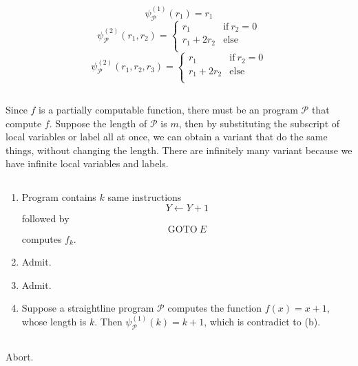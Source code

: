 \subsection{}
\[ \psi_{\mathscr{P}}^{(1)}(r_{1}) = r_{1} \]
\[ \psi_{\mathscr{P}}^{(2)}(r_{1},r_{2}) = \left\{
   \begin{array}{ll}
     r_{1}        & \mathrm{if}\ r_{2} = 0 \\
     r_{1}+2r_{2} & \mathrm{else} \\
   \end{array}
   \right.
\]
\[ \psi_{\mathscr{P}}^{(2)}(r_{1},r_{2},r_{3}) = \left\{
   \begin{array}{ll}
     r_{1}        & \mathrm{if}\ r_{2} = 0 \\
     r_{1}+2r_{2} & \mathrm{else} \\
   \end{array}
   \right.
\]


\subsection{}
Since $f$ is a partially computable function, there must be an program
$\mathscr{P}$ that compute $f$. Suppose the length of $\mathscr{P}$ is
$m$, then by substituting the subscript of local variables or label all
at once, we can obtain a variant that do the same things, without changing
the length. There are infinitely many variant because we have infinite
local variables and labels.


\subsection{}
\begin{enumerate}
\item
Program contains $k$ same instructions \[ Y \gets Y + 1 \] followed by
\[ \mathrm{GOTO}\ E \] computes $f_{k}$.

\item Admit.
\item Admit.

\item
Suppose a straightline program $\mathscr{P}$ computes the function
$ f(x) = x + 1 $, whose length is $k$. Then $ \psi_{\mathscr{P}}^{(1)}(k) = k+1 $,
which is contradict to (b).
\end{enumerate}


\subsection{}
Abort.


